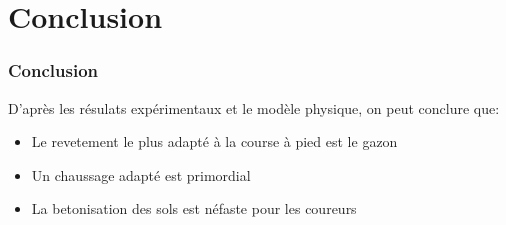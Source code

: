 \section{Conclusion}
\begin{frame}
    \frametitle{Conclusion}
    D'après les résulats expérimentaux et le modèle physique, on peut conclure que:
    \begin{itemize}
        \item Le revetement le plus adapté à la course à pied est le gazon
        \item Un chaussage adapté est primordial
        \item La betonisation des sols est néfaste pour les coureurs
    \end{itemize}

\end{frame}
